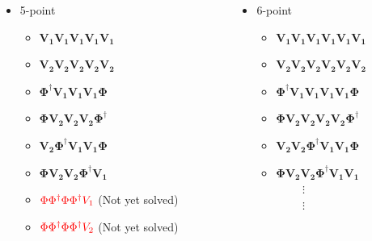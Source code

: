 \documentclass{beamer}
\begin{document}
\begin{frame}
    \begin{columns}[T]
        \begin{column}{0.6\textwidth}
        \begin{itemize}
            \item 5-point
            \begin{itemize}
                \item $\bm{V_1V_1V_1V_1V_1}$
                \item $\bm{V_2V_2V_2V_2V_2}$
                \item $\bm{\Phi^\dagger V_1V_1V_1\Phi}$
                \item $\bm{\Phi V_2V_2V_2\Phi^\dagger}$
                \item $\bm{V_2\Phi^\dagger V_1V_1\Phi}$
                \item $\bm{\Phi V_2V_2\Phi^\dagger V_1}$
                \item $\textcolor{red}{\Phi\Phi^\dagger\Phi\Phi^\dagger V_1}$ (Not yet solved)
                \item $\textcolor{red}{\Phi\Phi^\dagger\Phi\Phi^\dagger V_2}$ (Not yet solved)
            \end{itemize}
        \end{itemize}
    \end{column}
    \begin{column}{0.48\textwidth}
        \begin{itemize}
            \item 6-point
            \begin{itemize}
                \item $\bm{V_1V_1V_1V_1V_1V_1}$
                \item $\bm{V_2V_2V_2V_2V_2V_2}$
                \item $\bm{\Phi^\dagger V_1V_1V_1V_1\Phi}$
                \item $\bm{\Phi V_2V_2V_2V_2\Phi^\dagger}$
                \item $\bm{V_2V_2\Phi^\dagger V_1V_1\Phi}$
                \item $\bm{\Phi V_2V_2\Phi^\dagger V_1V_1}$\\
                $\qquad$ $\vdots$\\
                $\qquad$ $ \vdots$
            \end{itemize}
        \end{itemize}
    \end{column}
    \end{columns}
\end{frame}
\end{document}
